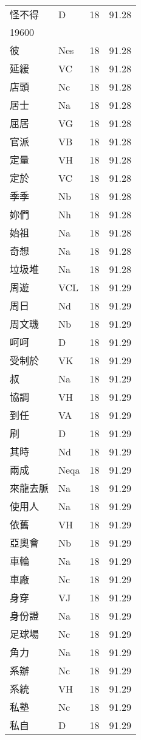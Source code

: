 \documentclass[twocolumn]{book}
\begin{document}
\begin{supertabular}{llrr}
怪不得 & D & 18 &  91.28\\
19600\\
彼 & Nes & 18 &  91.28\\
延緩 & VC & 18 &  91.28\\
店頭 & Nc & 18 &  91.28\\
居士 & Na & 18 &  91.28\\
屈居 & VG & 18 &  91.28\\
官派 & VB & 18 &  91.28\\
定量 & VH & 18 &  91.28\\
定於 & VC & 18 &  91.28\\
季季 & Nb & 18 &  91.28\\
妳們 & Nh & 18 &  91.28\\
始祖 & Na & 18 &  91.28\\
奇想 & Na & 18 &  91.28\\
垃圾堆 & Na & 18 &  91.28\\
周遊 & VCL & 18 &  91.29\\
周日 & Nd & 18 &  91.29\\
周文璣 & Nb & 18 &  91.29\\
呵呵 & D & 18 &  91.29\\
受制於 & VK & 18 &  91.29\\
叔 & Na & 18 &  91.29\\
協調 & VH & 18 &  91.29\\
到任 & VA & 18 &  91.29\\
刷 & D & 18 &  91.29\\
其時 & Nd & 18 &  91.29\\
兩成 & Neqa & 18 &  91.29\\
來龍去脈 & Na & 18 &  91.29\\
使用人 & Na & 18 &  91.29\\
依舊 & VH & 18 &  91.29\\
亞奧會 & Nb & 18 &  91.29\\
車輪 & Na & 18 &  91.29\\
車廠 & Nc & 18 &  91.29\\
身穿 & VJ & 18 &  91.29\\
身份證 & Na & 18 &  91.29\\
足球場 & Nc & 18 &  91.29\\
角力 & Na & 18 &  91.29\\
系辦 & Nc & 18 &  91.29\\
系統 & VH & 18 &  91.29\\
私塾 & Nc & 18 &  91.29\\
私自 & D & 18 &  91.29\\

\end{supertabular}
\end{document}
